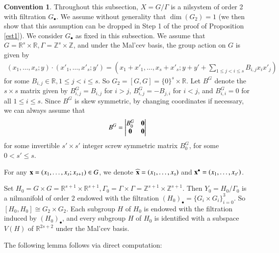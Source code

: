 \documentclass[12pt,amstex]{amsart}
\theoremstyle{definition}
\newtheorem{conv}[thm]{Convention}
\begin{document}
\begin{conv}\label{conv2}
Throughout this subsection, $X=G/\Gamma$ is a nilsystem of order 2 with filtration $G_{\bullet}$. We assume without generality that $\dim(G_{2})=1$ (we then show that this assumption can be dropped in Step 1 of the proof of Proposition \ref{est1}). We consider $G_{\bullet}$ as fixed in this subsection. We assume that $G=\mathbb{R}^{s}\times\mathbb{R},\Gamma=\mathbb{Z}^{s}\times\mathbb{Z}$, and under the Mal'cev basis, the group action on $G$ is given by
\begin{equation}\nonumber
    \begin{split}
      (x_{1},\dots,x_{s}; y)\cdot(x'_{1},\dots,x'_{s}; y')=(x_{1}+x'_{1},\dots,x_{s}+x'_{s}; y+y'+\sum_{1\leq j<i\leq s}B_{i,j}x_{i}x'_{j})
    \end{split}
  \end{equation}
  for some $B_{i,j}\in\mathbb{R}, 1\leq j<i\leq s$. So $G_{2}=[G,G]=\{0\}^{s}\times\mathbb{R}$. Let $B^{G}$ denote the $s\times s$ matrix given by $B^{G}_{i,j}=B_{i,j}$
for $i>j$, $B^{G}_{i,j}=-B_{j,i}$ for $i<j$, and $B^{G}_{i,i}=0$ for all $1\leq i\leq s$.
Since $B^{G}$ is skew symmetric, by changing coordinates if necessary, we can always assume that
\begin{equation}\nonumber
B^{G}=\begin{vmatrix}
 B_{0}^{G} & \bold{0} \\
 \bold{0}  & \bold{0} \\
\end{vmatrix}
\end{equation}
for some invertible $s'\times s'$ integer screw symmetric matrix $B_{0}^{G}$, for some $0<s'\leq s$.

For any
 $\bold{x}=(x_{1},\dots,x_{s};x_{s+1})\in G$, we denote $\widehat{\bold{x}}=(x_{1},\dots,x_{s})$
 and $\bold{x}^{\bullet}=(x_{1},\dots,x_{s'})$.

Set $H_{0}=G\times G=\mathbb{R}^{s+1}\times\mathbb{R}^{s+1}, \Gamma_{0}=\Gamma\times\Gamma=\mathbb{Z}^{s+1}\times\mathbb{Z}^{s+1}$. Then $Y_{0}=H_{0}/\Gamma_{0}$ is a nilmanifold of order 2 endowed with the filtration $(H_{0})_{\bullet}=\{G_{i}\times G_{i}\}_{i=0}^{3}$. So $[H_{0},H_{0}]\cong G_{2}\times G_{2}$. Each subgroup $H$ of $H_{0}$ is endowed with the filtration induced by $(H_{0})_{\bullet}$,
   and every subgroup $H$ of $H_{0}$ is identified with a subspace $V(H)$ of $\mathbb{R}^{2s+2}$ under the Mal'cev basis.
\end{conv}

 The following lemma follows via direct computation:
\end{document}
